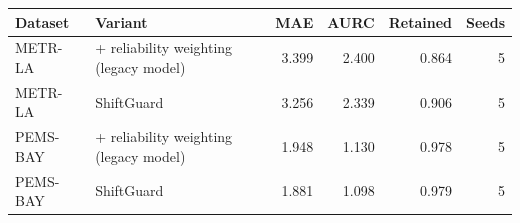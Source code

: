 \begin{tabular}{llrrrr}
\toprule
Dataset & Variant & MAE & AURC & Retained & Seeds \\
\midrule
METR-LA & + reliability weighting (legacy model) & 3.399 & 2.400 & 0.864 & 5 \\
METR-LA & ShiftGuard & 3.256 & 2.339 & 0.906 & 5 \\
PEMS-BAY & + reliability weighting (legacy model) & 1.948 & 1.130 & 0.978 & 5 \\
PEMS-BAY & ShiftGuard & 1.881 & 1.098 & 0.979 & 5 \\
\bottomrule
\end{tabular}
